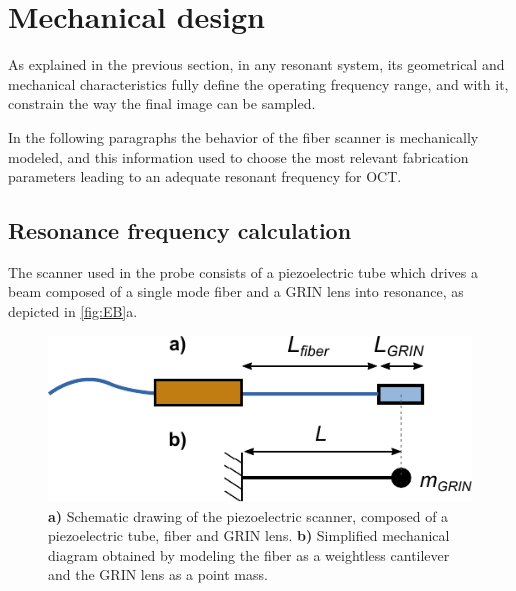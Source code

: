 \section{Mechanical design}
\label{sec:mechDesign}
As explained in the previous section, in any resonant system, its geometrical and mechanical characteristics fully define the operating frequency range, and with it, constrain the way the final image can be sampled.

In the following paragraphs the behavior of the fiber scanner is mechanically modeled, and this information used to choose the most relevant fabrication parameters leading to an adequate resonant frequency for OCT.


\subsection{Resonance frequency calculation}
The scanner used in the probe consists of a piezoelectric tube which drives a beam composed of a single mode fiber and a GRIN lens into resonance, as depicted in \autoref{fig:EB}a.  

\begin{figure}[h!]\centering
      \includegraphics{figures/30_DesignSimulation/Mechanical/EB.pdf}
      \caption{\textbf{a)} Schematic drawing of the piezoelectric scanner, composed of a piezoelectric tube, fiber and GRIN lens. 
      \textbf{b)} Simplified mechanical diagram obtained by modeling the fiber as a weightless cantilever and the GRIN lens as a point mass.}
      \label{fig:EB}
\end{figure}

